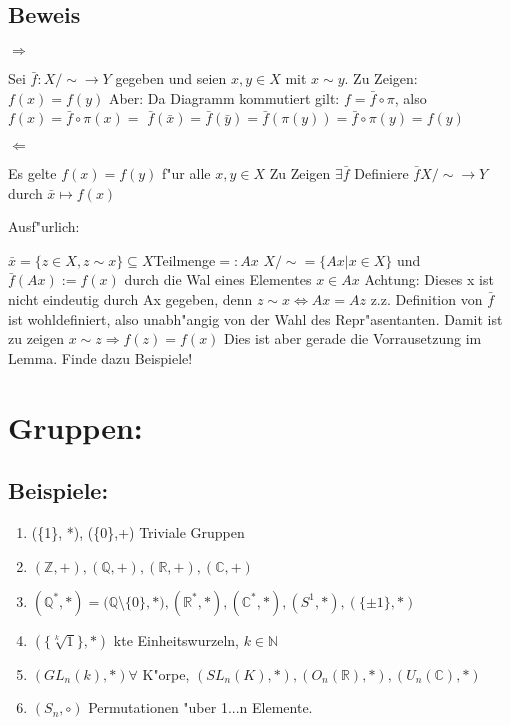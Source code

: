 \documentclass[12pt,a4paper,ngerman]{scrreprt}
\begin{document}
\section{Beweis}

$\Rightarrow$

Sei $\bar{f}: X/\!\sim \to Y$ gegeben und seien $x,y \in X$ mit $x\sim y$. Zu Zeigen: $f(x) = f(y)$
Aber: Da Diagramm kommutiert gilt:
$f=\bar{f}\circ \pi$, also $f(x)=\bar{f} \circ \pi(x) =$
$\bar{f}(\bar{x}) = \bar{f}(\bar{y}) = \bar{f}(\pi(y)) = \bar{f} \circ \pi(y) = f(y)$

$\Leftarrow$

Es gelte $f(x) = f(y)$ f"ur alle $x,y \in X$
Zu Zeigen $\exists \bar{f}$
Definiere $\bar{f} X/\!\sim \to Y$ durch $\bar{x} \mapsto f(x)$

Ausf"urlich:

$\bar{x} = \{z\in X, z \sim x \} \subseteq X $Teilmenge$ =: Ax$
$X/\sim = \{Ax | x\in X\}$ und $\bar{f}(Ax) := f(x)$ durch die Wal eines Elementes $x \in Ax$
Achtung: Dieses x ist nicht eindeutig durch Ax gegeben, denn 
$z \sim x \Leftrightarrow Ax = Az$
z.z. Definition von $\bar{f}$ ist wohldefiniert, also 
unabh"angig von der Wahl des Repr"asentanten.
Damit ist zu zeigen $x \sim z \Rightarrow f(z) = f(x)$
Dies ist aber gerade die Vorrausetzung im Lemma. 
Finde dazu Beispiele!


\chapter{Gruppen:}
\section{Beispiele:}
\begin{enumerate}[]
\item (\{1\}, *),  (\{0\},+) Triviale Gruppen
\item $(\mathbb{Z},+),(\mathbb{Q},+), (\mathbb{R}, +), (\mathbb{C}, +)$
\item $(\mathbb{Q}^{*}, *) = (\mathbb{Q}$\textbackslash$\{0\}, *), (\mathbb{R}^*,*), (\mathbb{C}^*,*), (S^1, *), (\{\pm 1\},*)$
\item $(\{\sqrt[k]{1}\}, *)$ kte Einheitswurzeln, $k \in \mathbb{N}$
\item $(GL_n(k), *) \forall $ K"orpe, $(SL_n(K), *), (O_n (\mathbb{R}),*), (U_n(\mathbb{C}), *)$
\item $(S_n,\circ)$ Permutationen "uber 1...n Elemente.
\end{enumerate}
\end{document}
